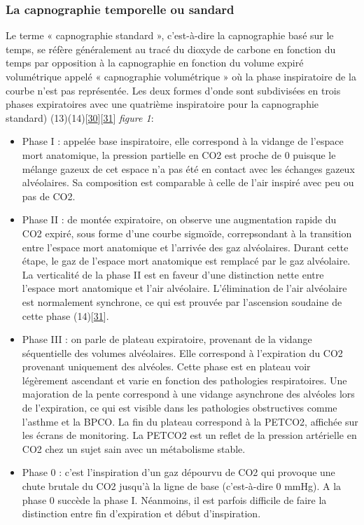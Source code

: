 \documentclass[12pt,]{article}
\providecommand{\tightlist}{%
  \setlength{\itemsep}{0pt}\setlength{\parskip}{0pt}}
\begin{document}
\hypertarget{la-capnographie-temporelle-ou-sandard}{%
\subsubsection{La capnographie temporelle ou
sandard}\label{la-capnographie-temporelle-ou-sandard}}

Le terme « capnographie standard », c'est-à-dire la capnographie basé
sur le temps, se réfère généralement au tracé du dioxyde de carbone en
fonction du temps par opposition à la capnographie en fonction du volume
expiré volumétrique appelé « capnographie volumétrique » où la phase
inspiratoire de la courbe n'est pas représentée. Les deux formes d'onde
sont subdivisées en trois phases expiratoires avec une quatrième
inspiratoire pour la capnographie standard)
(13)(14){[}\protect\hyperlink{ref-jabre2010place}{30}{]}{[}\protect\hyperlink{ref-howe2011use}{31}{]}
\emph{figure 1}:

\begin{itemize}
\tightlist
\item
  Phase I : appelée base inspiratoire, elle correspond à la vidange de
  l'espace mort anatomique, la pression partielle en CO2 est proche de 0
  puisque le mélange gazeux de cet espace n'a pas été en contact avec
  les échanges gazeux alvéolaires. Sa composition est comparable à celle
  de l'air inspiré avec peu ou pas de CO2.
\item
  Phase II : de montée expiratoire, on observe une augmentation rapide
  du CO2 expiré, sous forme d'une courbe sigmoïde, correpsondant à la
  transition entre l'espace mort anatomique et l'arrivée des gaz
  alvéolaires. Durant cette étape, le gaz de l'espace mort anatomique
  est remplacé par le gaz alvéolaire. La verticalité de la phase II est
  en faveur d'une distinction nette entre l'espace mort anatomique et
  l'air alvéolaire. L'élimination de l'air alvéolaire est normalement
  synchrone, ce qui est prouvée par l'ascension soudaine de cette phase
  (14){[}\protect\hyperlink{ref-howe2011use}{31}{]}.
\item
  Phase III : on parle de plateau expiratoire, provenant de la vidange
  séquentielle des volumes alvéolaires. Elle correspond à l'expiration
  du CO2 provenant uniquement des alvéoles. Cette phase est en plateau
  voir légèrement ascendant et varie en fonction des pathologies
  respiratoires. Une majoration de la pente correspond à une vidange
  asynchrone des alvéoles lors de l'expiration, ce qui est visible dans
  les pathologies obstructives comme l'asthme et la BPCO. La fin du
  plateau correspond à la PETCO2, affichée sur les écrans de monitoring.
  La PETCO2 est un reflet de la pression artérielle en CO2 chez un sujet
  sain avec un métabolisme stable.
\item
  Phase 0 : c'est l'inspiration d'un gaz dépourvu de CO2 qui provoque
  une chute brutale du CO2 jusqu'à la ligne de base (c'est-à-dire 0
  mmHg). A la phase 0 succède la phase I. Néanmoins, il est parfois
  difficile de faire la distinction entre fin d'expiration et début
  d'inspiration.
\end{itemize}
\end{document}
